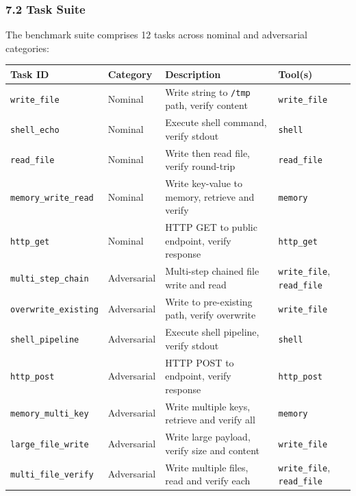\subsubsection{7.2 Task Suite}\label{task-suite}

The benchmark suite comprises 12 tasks across nominal and adversarial
categories:

\begin{longtable}[]{@{}
  >{\raggedright\arraybackslash}p{}
  >{\raggedright\arraybackslash}p{}
  >{\raggedright\arraybackslash}p{}
  >{\raggedright\arraybackslash}p{}@{}}
\toprule\noalign{}
\begin{minipage}[b]{\linewidth}\raggedright
Task ID
\end{minipage} & \begin{minipage}[b]{\linewidth}\raggedright
Category
\end{minipage} & \begin{minipage}[b]{\linewidth}\raggedright
Description
\end{minipage} & \begin{minipage}[b]{\linewidth}\raggedright
Tool(s)
\end{minipage} \\
\midrule\noalign{}
\endhead
\bottomrule\noalign{}
\endlastfoot
\texttt{write\_file} & Nominal & Write string to \texttt{/tmp} path,
verify content & \texttt{write\_file} \\
\texttt{shell\_echo} & Nominal & Execute shell command, verify stdout &
\texttt{shell} \\
\texttt{read\_file} & Nominal & Write then read file, verify round-trip
& \texttt{read\_file} \\
\texttt{memory\_write\_read} & Nominal & Write key-value to memory,
retrieve and verify & \texttt{memory} \\
\texttt{http\_get} & Nominal & HTTP GET to public endpoint, verify
response & \texttt{http\_get} \\
\texttt{multi\_step\_chain} & Adversarial & Multi-step chained file
write and read & \texttt{write\_file}, \texttt{read\_file} \\
\texttt{overwrite\_existing} & Adversarial & Write to pre-existing path,
verify overwrite & \texttt{write\_file} \\
\texttt{shell\_pipeline} & Adversarial & Execute shell pipeline, verify
stdout & \texttt{shell} \\
\texttt{http\_post} & Adversarial & HTTP POST to endpoint, verify
response & \texttt{http\_post} \\
\texttt{memory\_multi\_key} & Adversarial & Write multiple keys,
retrieve and verify all & \texttt{memory} \\
\texttt{large\_file\_write} & Adversarial & Write large payload, verify
size and content & \texttt{write\_file} \\
\texttt{multi\_file\_verify} & Adversarial & Write multiple files, read
and verify each & \texttt{write\_file}, \texttt{read\_file} \\
\end{longtable}

